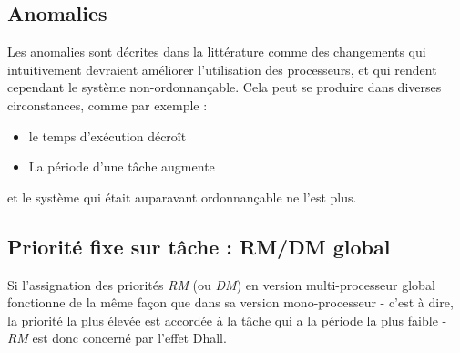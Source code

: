 \documentclass[11pt,a4paper,oneside]{report}
\begin{document}

%



\subsection{Anomalies}
Les anomalies sont décrites dans la littérature comme des changements qui intuitivement devraient 
améliorer l'utilisation des processeurs, et qui rendent cependant le système non-ordonnançable. 
Cela peut se produire dans diverses circonstances, comme par exemple :\\
\begin{itemize}
	\item le temps d'exécution décroît
	\item La période d'une tâche augmente
\end{itemize}
et le système qui était auparavant ordonnançable ne l'est plus.



\subsection{Priorité fixe sur tâche : RM/DM global}
Si l'assignation des priorités \textit{RM} (ou \textit{DM}) en version multi-processeur global 
fonctionne de la même façon que dans sa version mono-processeur - 
c'est à dire, la priorité la plus élevée est accordée à la tâche qui a la période la plus faible - 
\textit{RM} est donc concerné par l'effet Dhall. \\

\end{document}
